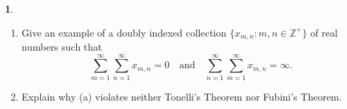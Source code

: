 \documentclass[12pt]{article}
\theoremstyle{definition}
\newtheorem{ex}{}
\newenvironment{exercise}[1]{
	\renewcommand{\theex}{#1}
	\begin{ex}
		}{\end{ex}}
\begin{document}
\begin{exercise}{5B.2}\
	\begin{enumerate}[label=(\alph*)]
		\item Give an example of a doubly indexed collection $\lbrace x_{m,n} : m, n \in \mathbb{Z}^+ \rbrace$ of real numbers such that \begin{equation*}
			      \sum_{m=1}^\infty \sum_{n=1}^\infty x_{m,n} = 0 \hspace{1em}\text{and}\hspace{1em} \sum_{n=1}^\infty\sum_{m=1}^\infty x_{m,n} = \infty.
		      \end{equation*}
		\item Explain why (a) violates neither Tonelli's Theorem nor Fubini's Theorem.
	\end{enumerate}
\end{exercise}
\end{document}
